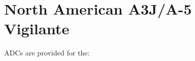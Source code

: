 \section{North American A3J/A-5 Vigilante}

ADCs are provided for the:
\begin{adclist}
\end{adclist}

